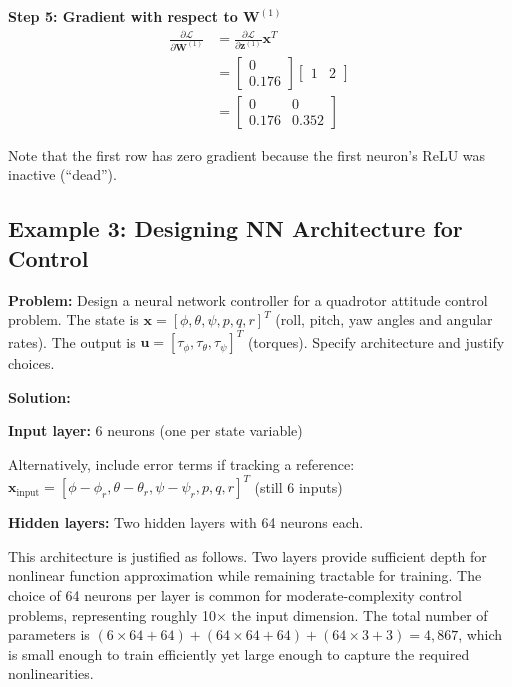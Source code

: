 \begin{examplebox}
\textbf{Step 5: Gradient with respect to $\mathbf{W}^{(1)}$}
\begin{align}
\frac{\partial \mathcal{L}}{\partial \mathbf{W}^{(1)}} &= \frac{\partial \mathcal{L}}{\partial \mathbf{z}^{(1)}} \mathbf{x}^T \\
&= \begin{bmatrix} 0 \\ 0.176 \end{bmatrix} \begin{bmatrix} 1 & 2 \end{bmatrix} \\
&= \boxed{\begin{bmatrix} 0 & 0 \\ 0.176 & 0.352 \end{bmatrix}}
\end{align}

Note that the first row has zero gradient because the first neuron's ReLU was inactive (``dead'').
\end{examplebox}

\subsection{Example 3: Designing NN Architecture for Control}

\textbf{Problem:} Design a neural network controller for a quadrotor attitude control problem. The state is $\mathbf{x} = [\phi, \theta, \psi, p, q, r]^T$ (roll, pitch, yaw angles and angular rates). The output is $\mathbf{u} = [\tau_\phi, \tau_\theta, \tau_\psi]^T$ (torques). Specify architecture and justify choices.

\textbf{Solution:}

\textbf{Input layer:} 6 neurons (one per state variable)

Alternatively, include error terms if tracking a reference:
$\mathbf{x}_{\text{input}} = [\phi - \phi_r, \theta - \theta_r, \psi - \psi_r, p, q, r]^T$ (still 6 inputs)

\textbf{Hidden layers:} Two hidden layers with 64 neurons each.

This architecture is justified as follows. Two layers provide sufficient depth for nonlinear function approximation while remaining tractable for training. The choice of 64 neurons per layer is common for moderate-complexity control problems, representing roughly 10$\times$ the input dimension. The total number of parameters is $(6 \times 64 + 64) + (64 \times 64 + 64) + (64 \times 3 + 3) = 4,867$, which is small enough to train efficiently yet large enough to capture the required nonlinearities.

